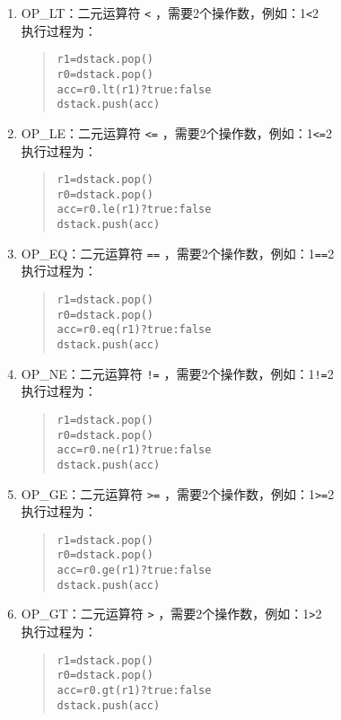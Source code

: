 \begin{enumerate}
\item OP\_LT：二元运算符 \verb|<| ，需要2个操作数，例如：1\verb|<|2 \\
执行过程为：
\begin{quote}
\begin{verbatim}
r1=dstack.pop()
r0=dstack.pop()
acc=r0.lt(r1)?true:false
dstack.push(acc)
\end{verbatim}
\end{quote}

\item OP\_LE：二元运算符 \verb|<=| ，需要2个操作数，例如：1\verb|<=|2 \\
执行过程为：
\begin{quote}
\begin{verbatim}
r1=dstack.pop()
r0=dstack.pop()
acc=r0.le(r1)?true:false
dstack.push(acc)
\end{verbatim}
\end{quote}

\item OP\_EQ：二元运算符 \verb|==| ，需要2个操作数，例如：1\verb|==|2 \\
执行过程为：
\begin{quote}
\begin{verbatim}
r1=dstack.pop()
r0=dstack.pop()
acc=r0.eq(r1)?true:false
dstack.push(acc)
\end{verbatim}
\end{quote}

\item OP\_NE：二元运算符 \verb|!=| ，需要2个操作数，例如：1\verb|!=|2 \\
执行过程为：
\begin{quote}
\begin{verbatim}
r1=dstack.pop()
r0=dstack.pop()
acc=r0.ne(r1)?true:false
dstack.push(acc)
\end{verbatim}
\end{quote}

\item OP\_GE：二元运算符 \verb|>=| ，需要2个操作数，例如：1\verb|>=|2 \\
执行过程为：
\begin{quote}
\begin{verbatim}
r1=dstack.pop()
r0=dstack.pop()
acc=r0.ge(r1)?true:false
dstack.push(acc)
\end{verbatim}
\end{quote}

\item OP\_GT：二元运算符 \verb|>| ，需要2个操作数，例如：1\verb|>|2 \\
执行过程为：
\begin{quote}
\begin{verbatim}
r1=dstack.pop()
r0=dstack.pop()
acc=r0.gt(r1)?true:false
dstack.push(acc)
\end{verbatim}
\end{quote}


\end{enumerate}
